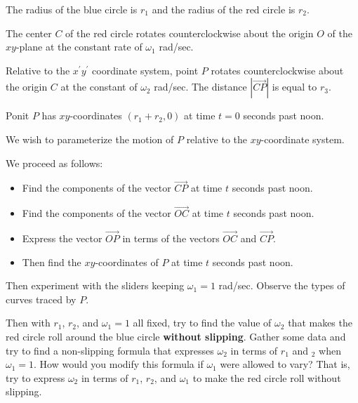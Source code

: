 \documentclass{ximera}
\begin{document}
\begin{exploration}  \label{Edst4hnt}
The radius of the blue circle is $r_1$ and the radius of the red circle is $r_2$.
 
The center $C$ of the red circle rotates counterclockwise about the origin $O$ of the $xy$-plane at the constant rate of $\omega_1$ rad/sec.

Relative to the $x^\prime y^\prime$ coordinate system, point $P$ rotates counterclockwise about the origin $C$ at the constant
of $\omega_2$ rad/sec. The distance $|\overrightarrow{CP}|$ is equal to $r_3$.

Ponit $P$ has $xy$-coordinates $(r_1 + r_2 , 0)$ at time $t=0$ seconds past noon.

We wish to parameterize the motion of $P$ relative to the $xy$-coordinate system.

We proceed as follows:

\begin{itemize}

\item{Find the components of the vector $\overrightarrow{CP}$ at time $t$ seconds past noon.}

\item{Find the components of the vector $\overrightarrow{OC}$ at time $t$ seconds past noon.}


\item{Express the vector $\overrightarrow{OP}$ in terms of the vectors $\overrightarrow{OC}$ and $\overrightarrow{CP}$.}



\item{Then find the $xy$-coordinates of $P$ at time $t$ seconds past noon.}

\end{itemize}

Then experiment with the sliders keeping $\omega_1 = 1$ rad/sec. Observe the types of curves traced by $P$.

Then with $r_1$, $r_2$, and $\omega_1=1$ all fixed, try to find the value of $\omega_2$ that makes the red circle roll around the blue circle {\bf without slipping}. Gather some data and try to find a non-slipping formula that expresses $\omega_2$ in terms of $r_1$ and $_2$ when $\omega_1=1$. How would you modify this formula if $\omega_1$ were allowed to vary? That is, try to express $\omega_2$ in terms of $r_1$, $r_2$, and $\omega_1$ to make the red circle roll without slipping.


\end{exploration}
\end{document}
